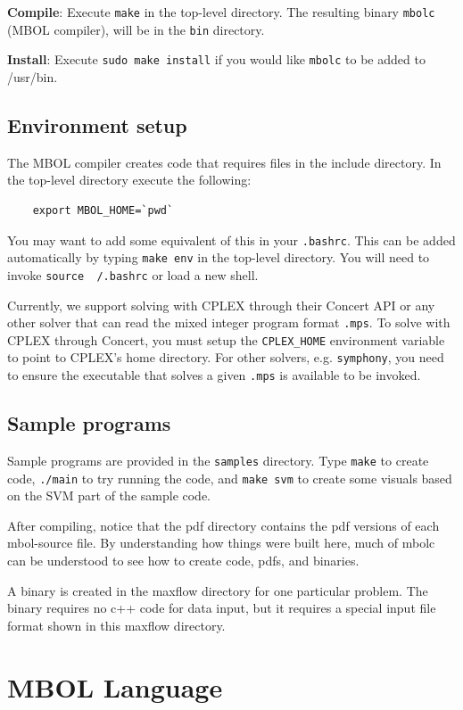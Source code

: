 \documentclass{article}
\newcommand{\subheader}[1]{
    \vspace{0.5in}
    \noindent\textbf{#1}:
}
\begin{document}
\subheader{Compile} Execute \texttt{make} in the top-level directory. The resulting binary \texttt{mbolc} (MBOL compiler), will be in the \texttt{bin} directory.

\subheader{Install} Execute \texttt{sudo make install} if you would like \texttt{mbolc} to be added to /usr/bin.

\subsection{Environment setup}

The MBOL compiler creates code that requires files in the include directory. In the top-level directory execute the following:
\begin{verbatim}
    export MBOL_HOME=`pwd`
\end{verbatim}
You may want to add some equivalent of this in your \texttt{.bashrc}. This can be added automatically by typing \texttt{make env} in the top-level directory. You will need to invoke \texttt{source ~/.bashrc} or load a new shell.

Currently, we support solving with CPLEX through their Concert API or any other solver that can read the mixed integer program format \texttt{.mps}. To solve with CPLEX through Concert, you must setup the \texttt{CPLEX\_HOME} environment variable to point to CPLEX's home directory. For other solvers, e.g. \texttt{symphony}, you need to ensure the executable that solves a given \texttt{.mps} is available to be invoked.

\subsection{Sample programs}

Sample programs are provided in the \texttt{samples} directory. Type \texttt{make} to create code, \texttt{./main} to try running the code, and \texttt{make svm} to create some visuals based on the SVM part of the sample code. 

After compiling, notice that the pdf directory contains the pdf versions of each mbol-source file. By understanding how things were built here, much of mbolc can be understood to see how to create code, pdfs, and binaries. 

A binary is created in the maxflow directory for one particular problem. The binary requires no c++ code for data input, but it requires a special input file format shown in this maxflow directory.

\section{MBOL Language}
\end{document}

